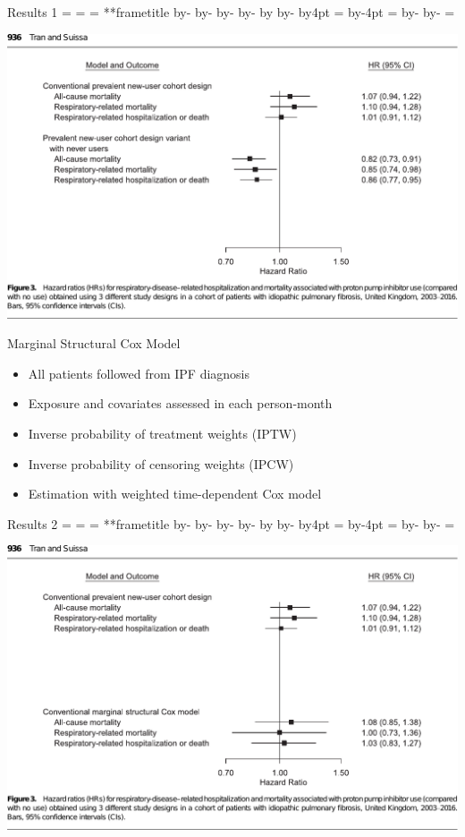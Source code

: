 \documentclass[aspectratio=169,12pt]{beamer} %
\makeatletter
\newif\ifsidebartheme
\newcommand*{\calculatespace}{%
    \contentheight=\paperheight%
    \ifx\beamer@frametitle\@empty%
        \setbox\@tempboxa=\box\voidb@x%
      \else%
        \setbox\@tempboxa=\vbox{%
          \vbox{}%
          {\parskip0pt\usebeamertemplate***{frametitle}}%
        }%
        \ifsidebartheme%
          \advance\contentheight by-1em%
        \fi%
      \fi%
    \advance\contentheight by-\ht\@tempboxa%
    \advance\contentheight by-\dp\@tempboxa%
    \advance\contentheight by-\beamer@frametopskip%
    \ifbeamer@plainframe%
    \contentbottom=0pt%
    \else%
    \advance\contentheight by-\headheight%
    \advance\contentheight by\headdp%
    \advance\contentheight by-\footheight%
    \advance\contentheight by4pt%
    \contentbottom=\footheight%
    \advance\contentbottom by-4pt%
    \fi%
    \contentwidth=\paperwidth%
    \ifbeamer@plainframe%
    \contentleft=0pt%
    \else%
    \advance\contentwidth by-\beamer@rightsidebar%
    \advance\contentwidth by-\beamer@leftsidebar\relax%
    \contentleft=\beamer@leftsidebar%
    \fi%
}
\makeatother
\begin{document}
\begin{frame}{Results 1}
    \calculatespace%
    \begin{center}
	\includegraphics[height=0.90\contentheight]{ref/suissa-fig3-pnuc.pdf}
    \end{center}
\end{frame}

\begin{frame}{Marginal Structural Cox Model}
    \begin{itemize}
	\item All patients followed from IPF diagnosis
	\item Exposure and covariates assessed in each person-month
	\item Inverse probability of treatment weights (IPTW)
	\item Inverse probability of censoring weights (IPCW)
	\item Estimation with weighted time-dependent Cox model
    \end{itemize}
\end{frame}

\begin{frame}{Results 2}
    \calculatespace%
    \begin{center}
	\includegraphics[height=0.90\contentheight]{ref/suissa-fig3-mscm.pdf}
    \end{center}
\end{frame}
\end{document}
